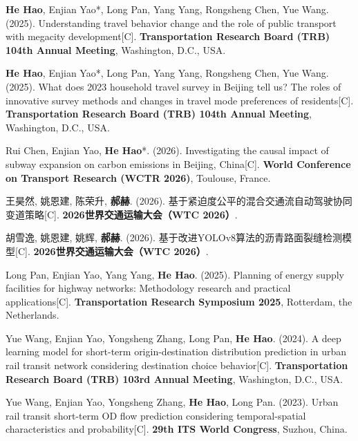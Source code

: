 \begin{enumerate}[leftmargin=*, parsep=5pt, label={[\arabic*]}]

	\item \textbf{He Hao}, Enjian Yao*, Long Pan, Yang Yang, Rongsheng Chen, Yue Wang. (2025). Understanding travel behavior change and the role of public transport with megacity development[C]. \textbf{Transportation Research Board (TRB) 104th Annual Meeting}, Washington, D.C., USA.

	\item \textbf{He Hao}, Enjian Yao*, Long Pan, Yang Yang, Rongsheng Chen, Yue Wang. (2025). What does 2023 household travel survey in Beijing tell us? The roles of innovative survey methods and changes in travel mode preferences of residents[C]. \textbf{Transportation Research Board (TRB) 104th Annual Meeting}, Washington, D.C., USA.
	
	\item Rui Chen, Enjian Yao, \textbf{He Hao}*. (2026). Investigating the causal impact of subway expansion on carbon emissions in Beijing, China[C]. \textbf{World Conference on Transport Research (WCTR 2026)}, Toulouse, France.

	\item 王昊然, 姚恩建, 陈荣升, \textbf{郝赫}. (2026). 基于紧迫度公平的混合交通流自动驾驶协同变道策略[C]. \textbf{2026世界交通运输大会（WTC 2026）}. 

	\item 胡雪逸, 姚恩建, 姚辉, \textbf{郝赫}. (2026). 基于改进YOLOv8算法的沥青路面裂缝检测模型[C]. \textbf{2026世界交通运输大会（WTC 2026）}. 

	\item Long Pan, Enjian Yao, Yang Yang, \textbf{He Hao}. (2025). Planning of energy supply facilities for highway networks: Methodology research and practical applications[C]. \textbf{Transportation Research Symposium 2025}, Rotterdam, the Netherlands.

	\item Yue Wang, Enjian Yao, Yongsheng Zhang, Long Pan, \textbf{He Hao}. (2024). A deep learning model for short-term origin-destination distribution prediction in urban rail transit network considering destination choice behavior[C]. \textbf{Transportation Research Board (TRB) 103rd Annual Meeting}, Washington, D.C., USA.

	\item Yue Wang, Enjian Yao, Yongsheng Zhang, \textbf{He Hao}, Long Pan. (2023). Urban rail transit short-term OD flow prediction considering temporal-spatial characteristics and probability[C]. \textbf{29th ITS World Congress}, Suzhou, China.

\end{enumerate}

